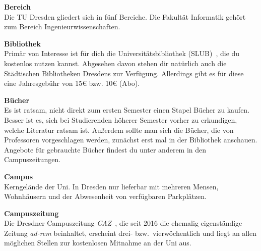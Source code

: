 \begin{multicols}{2}

\textbf{Bereich} \\
Die TU Dresden gliedert sich in fünf Bereiche.
Die Fakultät Informatik gehört zum Bereich Ingenieurwissenschaften.


\textbf{Bibliothek} \\
Primär von Interesse ist für dich die Universitätsbibliothek (SLUB)~, die du kostenlos nutzen kannst.
Abgesehen davon stehen dir natürlich auch die Städtischen Bibliotheken Dresdens zur Verfügung.
Allerdings gibt es für diese eine Jahresgebühr von 15\euro{} bzw. 10\euro{} (Abo).

\textbf{Bücher} \\
Es ist ratsam, nicht direkt zum ersten Semester einen Stapel Bücher zu kaufen.
Besser ist es, sich bei Studierenden höherer Semester vorher zu erkundigen, welche Literatur ratsam ist.
Außerdem sollte man sich die Bücher, die von Professoren vorgeschlagen werden, zunächst erst mal in der Bibliothek anschauen.
Angebote für gebrauchte Bücher findest du unter anderem in den Campuszeitungen.

\textbf{Campus} \\
Kerngelände der Uni. In Dresden nur lieferbar mit mehreren Mensen, Wohnhäusern und der Abwesenheit von verfügbaren Parkplätzen.

\vfill\columnbreak%

\textbf{Campuszeitung} \\
Die Dresdner Campuszeitung \textit{CAZ}~, die seit 2016 die ehemalig eigenständige Zeitung \textit{ad-rem} beinhaltet, erscheint drei- bzw.\ vierwöchentlich und liegt an allen möglichen Stellen zur kostenlosen Mitnahme an der Uni aus.


\end{multicols}
